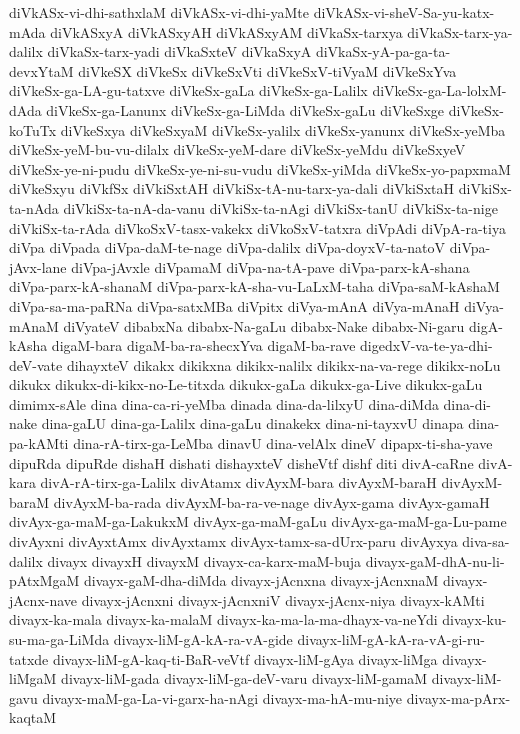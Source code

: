 {diVkASx-vi-dhi-sathxlaM
diVkASx-vi-dhi-yaMte
diVkASx-vi-sheV-Sa-yu-katx-mAda
diVkASxyA
diVkASxyAH
diVkASxyAM
diVkaSx-tarxya
diVkaSx-tarx-ya-dalilx
diVkaSx-tarx-yadi
diVkaSxteV
diVkaSxyA
diVkaSx-yA-pa-ga-ta-devxYtaM
diVkeSX
diVkeSx
diVkeSxVti
diVkeSxV-tiVyaM
diVkeSxYva
diVkeSx-ga-LA-gu-tatxve
diVkeSx-gaLa
diVkeSx-ga-Lalilx
diVkeSx-ga-La-lolxM-dAda
diVkeSx-ga-Lanunx
diVkeSx-ga-LiMda
diVkeSx-gaLu
diVkeSxge
diVkeSx-koTuTx
diVkeSxya
diVkeSxyaM
diVkeSx-yalilx
diVkeSx-yanunx
diVkeSx-yeMba
diVkeSx-yeM-bu-vu-dilalx
diVkeSx-yeM-dare
diVkeSx-yeMdu
diVkeSxyeV
diVkeSx-ye-ni-pudu
diVkeSx-ye-ni-su-vudu
diVkeSx-yiMda
diVkeSx-yo-papxmaM
diVkeSxyu
diVkfSx
diVkiSxtAH
diVkiSx-tA-nu-tarx-ya-dali
diVkiSxtaH
diVkiSx-ta-nAda
diVkiSx-ta-nA-da-vanu
diVkiSx-ta-nAgi
diVkiSx-tanU
diVkiSx-ta-nige
diVkiSx-ta-rAda
diVkoSxV-tasx-vakekx
diVkoSxV-tatxra
diVpAdi
diVpA-ra-tiya
diVpa
diVpada
diVpa-daM-te-nage
diVpa-dalilx
diVpa-doyxV-ta-natoV
diVpa-jAvx-lane
diVpa-jAvxle
diVpamaM
diVpa-na-tA-pave
diVpa-parx-kA-shana
diVpa-parx-kA-shanaM
diVpa-parx-kA-sha-vu-LaLxM-taha
diVpa-saM-kAshaM
diVpa-sa-ma-paRNa
diVpa-satxMBa
diVpitx
diVya-mAnA
diVya-mAnaH
diVya-mAnaM
diVyateV
dibabxNa
dibabx-Na-gaLu
dibabx-Nake
dibabx-Ni-garu
digA-kAsha
digaM-bara
digaM-ba-ra-shecxYva
digaM-ba-rave
digedxV-va-te-ya-dhi-deV-vate
dihayxteV
dikakx
dikikxna
dikikx-nalilx
dikikx-na-va-rege
dikikx-noLu
dikukx
dikukx-di-kikx-no-Le-titxda
dikukx-gaLa
dikukx-ga-Live
dikukx-gaLu
dimimx-sAle
dina
dina-ca-ri-yeMba
dinada
dina-da-lilxyU
dina-diMda
dina-di-nake
dina-gaLU
dina-ga-Lalilx
dina-gaLu
dinakekx
dina-ni-tayxvU
dinapa
dina-pa-kAMti
dina-rA-tirx-ga-LeMba
dinavU
dina-velAlx
dineV
dipapx-ti-sha-yave
dipuRda
dipuRde
dishaH
dishati
dishayxteV
disheVtf
dishf
diti
divA-caRne
divA-kara
divA-rA-tirx-ga-Lalilx
divAtamx
divAyxM-bara
divAyxM-baraH
divAyxM-baraM
divAyxM-ba-rada
divAyxM-ba-ra-ve-nage
divAyx-gama
divAyx-gamaH
divAyx-ga-maM-ga-LakukxM
divAyx-ga-maM-gaLu
divAyx-ga-maM-ga-Lu-pame
divAyxni
divAyxtAmx
divAyxtamx
divAyx-tamx-sa-dUrx-paru
divAyxya
diva-sa-dalilx
divayx
divayxH
divayxM
divayx-ca-karx-maM-buja
divayx-gaM-dhA-nu-li-pAtxMgaM
divayx-gaM-dha-diMda
divayx-jAcnxna
divayx-jAcnxnaM
divayx-jAcnx-nave
divayx-jAcnxni
divayx-jAcnxniV
divayx-jAcnx-niya
divayx-kAMti
divayx-ka-mala
divayx-ka-malaM
divayx-ka-ma-la-ma-dhayx-va-neYdi
divayx-ku-su-ma-ga-LiMda
divayx-liM-gA-kA-ra-vA-gide
divayx-liM-gA-kA-ra-vA-gi-ru-tatxde
divayx-liM-gA-kaq-ti-BaR-veVtf
divayx-liM-gAya
divayx-liMga
divayx-liMgaM
divayx-liM-gada
divayx-liM-ga-deV-varu
divayx-liM-gamaM
divayx-liM-gavu
divayx-maM-ga-La-vi-garx-ha-nAgi
divayx-ma-hA-mu-niye
divayx-ma-pArx-kaqtaM
}
